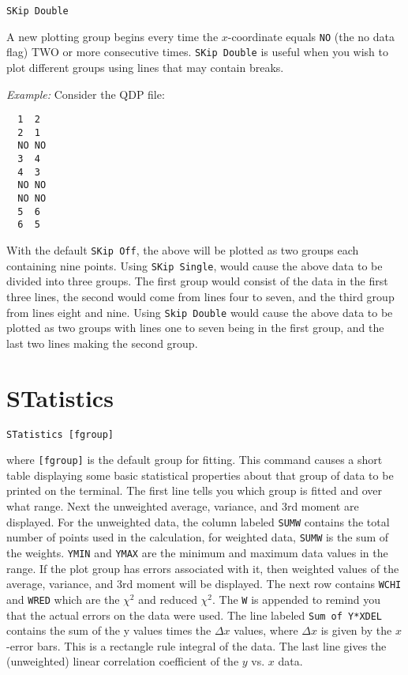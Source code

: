 \medskip
\begin{verbatim}
SKip Double
\end{verbatim}
   A new plotting group begins every time the $x$-coordinate equals {\tt NO} 
(the no data flag) TWO or more consecutive times.  {\tt SKip~Double} is useful
when you wish to plot different groups using lines that may contain
breaks.

\medskip\noindent
{\em Example:}
Consider the QDP file:
\begin{verbatim}
  1  2
  2  1
  NO NO
  3  4
  4  3
  NO NO
  NO NO
  5  6
  6  5
\end{verbatim}
With the default {\tt SKip Off}, the above will be plotted as two groups
each containing nine points.  Using {\tt SKip Single}, would cause the above
data to be divided into three groups.  The first group would consist
of the data in the first three lines, the second would come from lines
four to seven, and the third group from lines eight and nine.  Using
{\tt Skip Double} would cause the above data to be plotted as two groups
with lines one to seven being in the first group, and the last
two lines making the second group.

\section*{STatistics}
\begin{verbatim}
STatistics [fgroup]
\end{verbatim}
   where {\tt [fgroup]} is the default group for fitting.  This
command causes a short table displaying some basic statistical properties 
about that group of data to be printed on the terminal.
The first line tells you which group is fitted and over what range.
Next the unweighted average, variance, and 3rd moment are displayed.
For the unweighted data, the column labeled {\tt SUMW} contains the total
number of points used in the calculation, for weighted data, {\tt SUMW}
is the sum of the weights.  {\tt YMIN} and {\tt YMAX} are the minimum and
maximum data values in the range.  If the plot group has errors
associated with it, then weighted values of the average, variance,
and 3rd moment will be displayed.  The next row contains {\tt WCHI} and
{\tt WRED} which are the $\chi^2$ and reduced $\chi^2$.  The {\tt W} is appended
to remind you that the actual errors on the data were used.  The line
labeled {\tt Sum~of~Y*XDEL} contains the sum of the y values times the
$\Delta x$ values, where $\Delta x$ is given by the $x$-error bars.  This
is a rectangle rule integral of the data.  The last line gives the
(unweighted) linear correlation coefficient of the $y$ vs. $x$ data.

